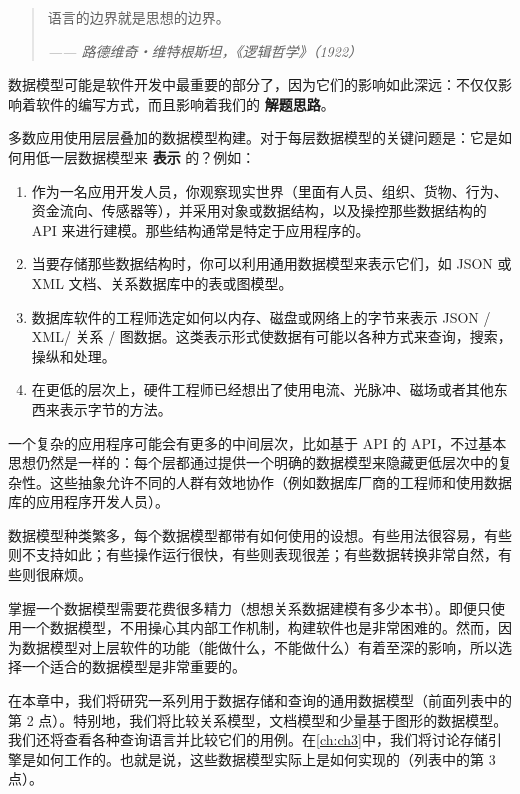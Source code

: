 \begin{quote}
    语言的边界就是思想的边界。
    
    \textit{—— 路德维奇・维特根斯坦，《逻辑哲学》（1922）}
\end{quote}

数据模型可能是软件开发中最重要的部分了，因为它们的影响如此深远：不仅仅影响着软件的编写方式，而且影响着我们的 \textbf{解题思路}。

多数应用使用层层叠加的数据模型构建。对于每层数据模型的关键问题是：它是如何用低一层数据模型来 \textbf{表示} 的？例如：

\begin{enumerate}
    \item 作为一名应用开发人员，你观察现实世界（里面有人员、组织、货物、行为、资金流向、传感器等），并采用对象或数据结构，以及操控那些数据结构的 API 来进行建模。那些结构通常是特定于应用程序的。
    \item 当要存储那些数据结构时，你可以利用通用数据模型来表示它们，如 JSON 或 XML 文档、关系数据库中的表或图模型。
    \item 数据库软件的工程师选定如何以内存、磁盘或网络上的字节来表示 JSON / XML/ 关系 / 图数据。这类表示形式使数据有可能以各种方式来查询，搜索，操纵和处理。
    \item 在更低的层次上，硬件工程师已经想出了使用电流、光脉冲、磁场或者其他东西来表示字节的方法。
\end{enumerate}

一个复杂的应用程序可能会有更多的中间层次，比如基于 API 的 API，不过基本思想仍然是一样的：每个层都通过提供一个明确的数据模型来隐藏更低层次中的复杂性。这些抽象允许不同的人群有效地协作（例如数据库厂商的工程师和使用数据库的应用程序开发人员）。

数据模型种类繁多，每个数据模型都带有如何使用的设想。有些用法很容易，有些则不支持如此；有些操作运行很快，有些则表现很差；有些数据转换非常自然，有些则很麻烦。

掌握一个数据模型需要花费很多精力（想想关系数据建模有多少本书）。即便只使用一个数据模型，不用操心其内部工作机制，构建软件也是非常困难的。然而，因为数据模型对上层软件的功能（能做什么，不能做什么）有着至深的影响，所以选择一个适合的数据模型是非常重要的。

在本章中，我们将研究一系列用于数据存储和查询的通用数据模型（前面列表中的第 2 点）。特别地，我们将比较关系模型，文档模型和少量基于图形的数据模型。我们还将查看各种查询语言并比较它们的用例。在\autoref{ch:ch3}中，我们将讨论存储引擎是如何工作的。也就是说，这些数据模型实际上是如何实现的（列表中的第 3 点）。

